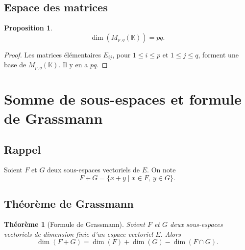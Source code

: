 \documentclass[11pt,a4paper]{article}
\newtheorem{theoreme}[definition]{Théorème}
\newtheorem{proposition}[definition]{Proposition}
\theoremstyle{remark}
\newcommand{\K}{\mathbb{K}}
\begin{document}
\subsection{Espace des matrices}

\begin{proposition}
\[
\dim(M_{p,q}(\K))=pq.
\]
\end{proposition}

\begin{proof}
Les matrices élémentaires \(E_{ij}\), pour \(1\le i\le p\) et \(1\le j\le q\), forment une base de \(M_{p,q}(\K)\). Il y en a \(pq\).
\end{proof}

\section{Somme de sous-espaces et formule de Grassmann}

\subsection{Rappel}

Soient \(F\) et \(G\) deux sous-espaces vectoriels de \(E\). On note
\[
F+G=\{x+y\mid x\in F,\ y\in G\}.
\]

\subsection{Théorème de Grassmann}

\begin{theoreme}[Formule de Grassmann]
Soient \(F\) et \(G\) deux sous-espaces vectoriels de dimension finie d’un espace vectoriel \(E\). Alors
\[
\dim(F+G)=\dim(F)+\dim(G)-\dim(F\cap G).
\]
\end{theoreme}
\end{document}
